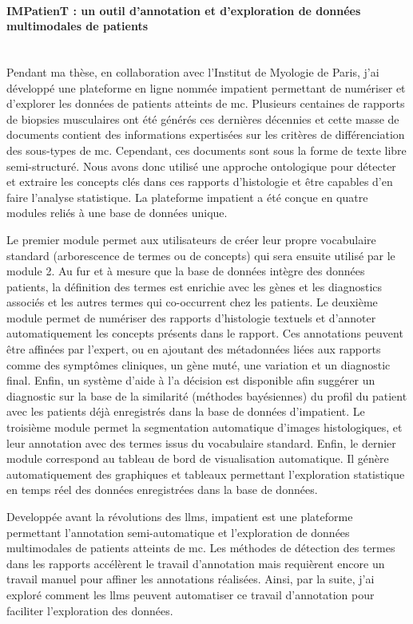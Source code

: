 \paragraph{\textbf{IMPatienT : un outil d’annotation et d’exploration de données multimodales de patients}}\mbox{}\\

Pendant ma thèse, en collaboration avec l’Institut de Myologie de Paris, j’ai développé une plateforme en ligne nommée \gls{impatient} permettant de numériser et d’explorer les données de patients atteints de \gls{mc}. Plusieurs centaines de rapports de biopsies musculaires ont été générés ces dernières décennies et cette masse de documents contient des informations expertisées sur les critères de différenciation des sous-types de \gls{mc}. Cependant, ces documents sont sous la forme de texte libre semi-structuré. Nous avons donc utilisé une approche ontologique pour détecter et extraire les concepts clés dans ces rapports d’histologie et être capables d’en faire l’analyse statistique. La plateforme \gls{impatient} a été conçue en quatre modules reliés à une base de données unique. 

Le premier module permet aux utilisateurs de créer leur propre vocabulaire standard (arborescence de termes ou de concepts) qui sera ensuite utilisé par le module 2. Au fur et à mesure que la base de données intègre des données patients, la définition des termes est enrichie avec les gènes et les diagnostics associés et les autres termes qui co-occurrent chez les patients. Le deuxième module permet de numériser des rapports d’histologie textuels et d’annoter automatiquement les concepts présents dans le rapport. Ces annotations peuvent être affinées par l’expert, ou en ajoutant des métadonnées liées aux rapports comme des symptômes cliniques, un gène muté, une variation et un diagnostic final. Enfin, un système d’aide à l’a décision est disponible afin suggérer un diagnostic sur la base de la similarité (méthodes bayésiennes) du profil du patient avec les patients déjà enregistrés dans la base de données d’\gls{impatient}. Le troisième module permet la segmentation automatique d’images histologiques, et leur annotation avec des termes issus du vocabulaire standard. Enfin, le dernier module correspond au tableau de bord de visualisation automatique. Il génère automatiquement des graphiques et tableaux permettant l’exploration statistique en temps réel des données enregistrées dans la base de données. 

Developpée avant la révolutions des \gls{llms}, \gls{impatient} est une plateforme permettant l’annotation semi-automatique et l’exploration de données multimodales de patients atteints de \gls{mc}. Les méthodes de détection des termes dans les rapports accélèrent le travail d'annotation mais requièrent encore un travail manuel pour affiner les annotations réalisées. Ainsi, par la suite, j'ai exploré comment les \gls{llms} peuvent automatiser ce travail d'annotation pour faciliter l'exploration des données.


